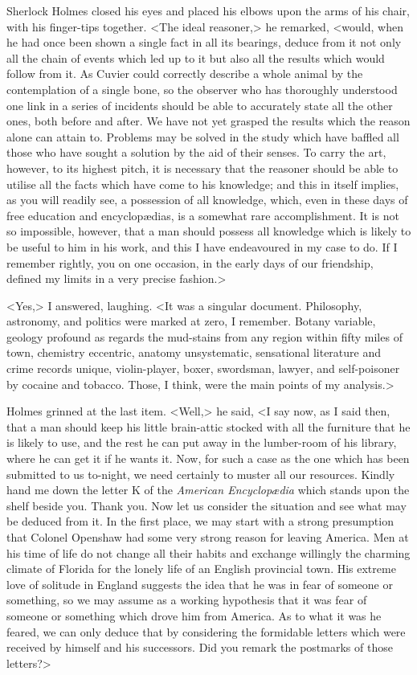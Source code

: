 Sherlock Holmes closed his eyes and placed his elbows upon the arms of his chair, with his finger-tips together. <The ideal reasoner,> he remarked, <would, when he had once been shown a single fact in all its bearings, deduce from it not only all the chain of events which led up to it but also all the results which would follow from it. As Cuvier could correctly describe a whole animal by the contemplation of a single bone, so the observer who has thoroughly understood one link in a series of incidents should be able to accurately state all the other ones, both before and after. We have not yet grasped the results which the reason alone can attain to. Problems may be solved in the study which have baffled all those who have sought a solution by the aid of their senses. To carry the art, however, to its highest pitch, it is necessary that the reasoner should be able to utilise all the facts which have come to his knowledge; and this in itself implies, as you will readily see, a possession of all knowledge, which, even in these days of free education and encyclopædias, is a somewhat rare accomplishment. It is not so impossible, however, that a man should possess all knowledge which is likely to be useful to him in his work, and this I have endeavoured in my case to do. If I remember rightly, you on one occasion, in the early days of our friendship, defined my limits in a very precise fashion.>

<Yes,> I answered, laughing. <It was a singular document. Philosophy, astronomy, and politics were marked at zero, I remember. Botany variable, geology profound as regards the mud-stains from any region within fifty miles of town, chemistry eccentric, anatomy unsystematic, sensational literature and crime records unique, violin-player, boxer, swordsman, lawyer, and self-poisoner by cocaine and tobacco. Those, I think, were the main points of my analysis.>

Holmes grinned at the last item. <Well,> he said, <I say now, as I said then, that a man should keep his little brain-attic stocked with all the furniture that he is likely to use, and the rest he can put away in the lumber-room of his library, where he can get it if he wants it. Now, for such a case as the one which has been submitted to us to-night, we need certainly to muster all our resources. Kindly hand me down the letter K of the \textit{American Encyclopædia} which stands upon the shelf beside you. Thank you. Now let us consider the situation and see what may be deduced from it. In the first place, we may start with a strong presumption that Colonel Openshaw had some very strong reason for leaving America. Men at his time of life do not change all their habits and exchange willingly the charming climate of Florida for the lonely life of an English provincial town. His extreme love of solitude in England suggests the idea that he was in fear of someone or something, so we may assume as a working hypothesis that it was fear of someone or something which drove him from America. As to what it was he feared, we can only deduce that by considering the formidable letters which were received by himself and his successors. Did you remark the postmarks of those letters?>

